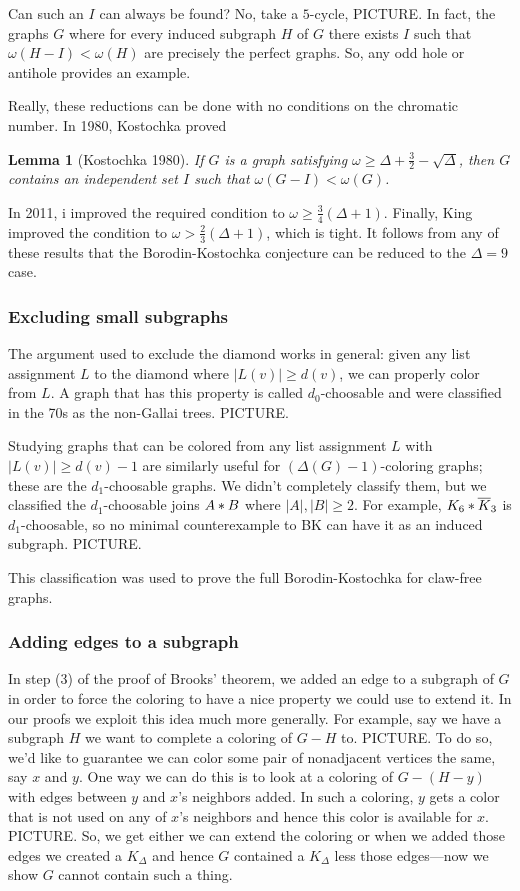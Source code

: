 \documentclass[12pt]{article}
\theoremstyle{plain}
\newtheorem{lem}[thm]{Lemma}
\theoremstyle{definition}
\theoremstyle{remark}
\newcommand{\card}[1]{\left|#1\right|}
\newcommand{\join}[2]{#1 \mbox{\hspace{2 pt}$\ast$\hspace{2 pt}} #2}
\begin{document}
Can such an $I$ can always be found?  No, take a $5$-cycle, PICTURE.  In fact, the graphs $G$ where for every induced subgraph $H$ of $G$ there exists $I$ such that $\omega(H-I) < \omega(H)$ are precisely the perfect graphs.  So, any odd hole or antihole provides an example.

Really, these reductions can be done with no conditions on the chromatic number. In 1980, Kostochka proved

\begin{lem}[Kostochka 1980]
If $G$ is a graph satisfying $\omega \geq \Delta + \frac32 - \sqrt{\Delta}$,
then $G$ contains an independent set $I$ such that $\omega(G - I) < \omega(G)$.
\end{lem}

In 2011, i improved the required condition to $\omega \geq \frac34 (\Delta + 1)$.  Finally, King improved the condition to $\omega > \frac23 (\Delta + 1)$, which is tight.  It follows from any of these results that the Borodin-Kostochka conjecture can be reduced to the $\Delta=9$ case.

\subsubsection{Excluding small subgraphs}
The argument used to exclude the diamond works in general: given any list assignment $L$ to the diamond where $\card{L(v)} \geq d(v)$, we can properly color from $L$.  A graph that has this property is called $d_0$-choosable and were classified in the 70s as the non-Gallai trees. PICTURE.

Studying graphs that can be colored from any list assignment $L$ with $\card{L(v)} \geq d(v) - 1$ are similarly useful for $(\Delta(G) - 1)$-coloring graphs; these are the $d_1$-choosable graphs.   We didn't completely classify them, but we classified the $d_1$-choosable joins $\join{A}{B}$ where $\card{A}, \card{B} \geq 2$.  For example, $\join{K_6}{\overline{K}_3}$ is $d_1$-choosable, so no minimal counterexample to BK can have it as an induced subgraph.  PICTURE.

This classification was used to prove the full Borodin-Kostochka for claw-free graphs.  

\subsubsection{Adding edges to a subgraph}
In step (3) of the proof of Brooks' theorem, we added an edge to a subgraph of $G$ in order to force the coloring to have a nice property we could use to extend it.  In our proofs we exploit this idea much more generally. For example, say we have a subgraph $H$ we want to complete a coloring of $G-H$ to.  PICTURE.  To do so, we'd like to guarantee we can color some pair of nonadjacent vertices the same, say $x$ and $y$.  One way we can do this is to look at a coloring of $G-(H-y)$ with edges between $y$ and $x$'s neighbors added.  In such a coloring, $y$ gets a color that is not used on any of $x$'s neighbors and hence this color is available for $x$.  PICTURE.  So, we get either we can extend the coloring or when we added those edges we created a $K_\Delta$ and hence $G$ contained a $K_\Delta$ less those edges---now we show $G$ cannot contain such a thing.
\end{document}
